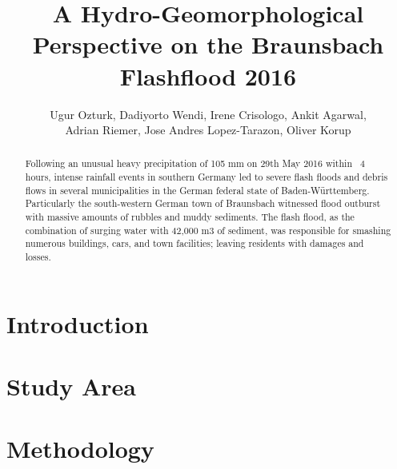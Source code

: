 \documentclass[10pt]{article}
\begin{document}
\title{A Hydro-Geomorphological Perspective on the Braunsbach Flashflood 2016}
\author{Ugur Ozturk, Dadiyorto Wendi, Irene Crisologo, Ankit Agarwal, \\
Adrian Riemer, Jose Andres Lopez-Tarazon, Oliver Korup}
\date{}

\maketitle

\begin{abstract}

Following an unusual heavy precipitation of 105 mm on 29th May 2016 within ~4 hours, intense rainfall events in southern Germany led to severe flash floods and debris flows in several municipalities in the German federal state of Baden-W{\"u}rttemberg. Particularly the south-western German town of Braunsbach witnessed flood outburst with massive amounts of rubbles and muddy sediments. The flash flood, as the combination of surging water with 42,000 m3 of sediment, was responsible for smashing numerous buildings, cars, and town facilities; leaving residents with damages and losses. %

\end{abstract}

\section{Introduction}



\section{Study Area}

\section{Methodology}
\end{document}
